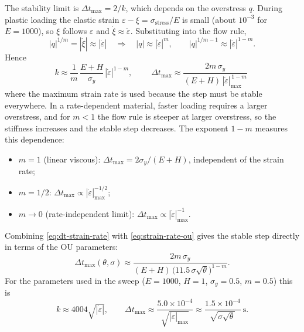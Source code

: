 \documentclass[11pt]{article}
\begin{document}
The stability limit is $\Delta t_{\max}=2/k$, which depends on the
overstress $q$. During plastic loading the elastic strain
$\varepsilon-\xi=\sigma_{\text{stress}}/E$ is small (about $10^{-3}$ for
$E=1000$), so $\xi$ follows $\varepsilon$ and $\dot\xi\approx\dot\varepsilon$.
Substituting into the flow rule,
\begin{equation}
    |q|^{1/m} = |\dot\xi| \approx |\dot\varepsilon|
    \quad\Longrightarrow\quad
    |q|\approx|\dot\varepsilon|^{m},
    \qquad
    |q|^{1/m-1}\approx|\dot\varepsilon|^{1-m}.
\end{equation}
Hence
\begin{equation}
    k \approx \frac{1}{m}\,\frac{E+H}{\sigma_y}\,|\dot\varepsilon|^{1-m},
    \qquad
    \boxed{\;\Delta t_{\max} \approx \frac{2m\,\sigma_y}{(E+H)\,|\dot\varepsilon|_{\max}^{\,1-m}}\;}
    \label{eq:dt-strain-rate}
\end{equation}
where the maximum strain rate is used because the step must be stable
everywhere. In a rate-dependent material, faster loading requires a larger
overstress, and for $m<1$ the flow rule is steeper at larger overstress, so
the stiffness increases and the stable step decreases. The exponent $1-m$
measures this dependence:
\begin{itemize}
    \item $m=1$ (linear viscous): $\Delta t_{\max}=2\sigma_y/(E+H)$, independent of the strain rate;
    \item $m=1/2$: $\Delta t_{\max}\propto|\dot\varepsilon|_{\max}^{-1/2}$;
    \item $m\to 0$ (rate-independent limit): $\Delta t_{\max}\propto|\dot\varepsilon|_{\max}^{-1}$.
\end{itemize}

Combining \eqref{eq:dt-strain-rate} with \eqref{eq:strain-rate-ou} gives the
stable step directly in terms of the OU parameters:
\begin{equation}
    \Delta t_{\max}(\theta,\sigma) \approx
    \frac{2m\,\sigma_y}{(E+H)\,\bigl(11.5\,\sigma\sqrt{\theta}\bigr)^{1-m}} .
\end{equation}
For the parameters used in the sweep ($E=1000$, $H=1$, $\sigma_y=0.5$,
$m=0.5$) this is
\begin{equation}
    k \approx 4004\sqrt{|\dot\varepsilon|},
    \qquad
    \Delta t_{\max} \approx \frac{5.0\times10^{-4}}{\sqrt{|\dot\varepsilon|_{\max}}}
    \approx \frac{1.5\times10^{-4}}{\sqrt{\sigma\sqrt{\theta}}}\ \mathrm{s}.
\end{equation}
\end{document}
